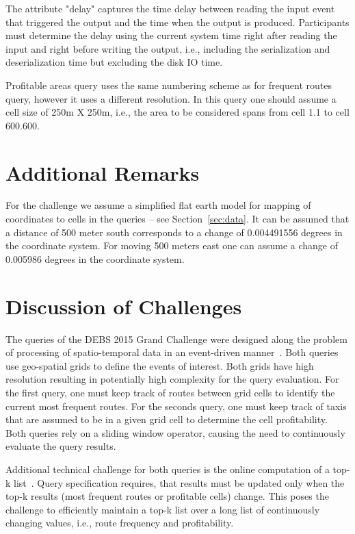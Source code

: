 \documentclass{sig-alternate}
\begin{document}
The attribute "delay" captures the time delay between reading the input event that triggered the output and the time when the output is produced. Participants must determine the delay using the current system time right after reading the input and right before writing the output, i.e., including the serialization and deserialization time but excluding the disk IO time. 

Profitable areas query uses the same numbering scheme as for frequent routes query, however it uses a different resolution. In this query one should assume a cell size of 250m X 250m, i.e., the area to be considered spans from cell 1.1 to cell 600.600.

\section{Additional Remarks}
For the challenge we assume a simplified flat earth model for mapping of coordinates to cells in the queries -- see Section~\ref{sec:data}. It can be assumed that a distance of 500 meter south corresponds to a change of 0.004491556 degrees in the coordinate system. For moving 500 meters east one can assume a change of 0.005986 degrees in the coordinate system.

\section{Discussion of Challenges}
The queries of the DEBS 2015 Grand Challenge were designed along the problem of processing of spatio-temporal data in an event-driven manner~\cite{peuquet1995event, mamoulis2004mining, mokbel2004sina}.  Both queries use geo-spatial grids to define the events of interest. Both grids have high resolution resulting in potentially high complexity for the query evaluation. For the first query, one must keep track of routes between grid cells to identify the current most frequent routes. For the seconds query, one must keep track of taxis that are assumed to be in a given grid cell to determine the cell profitability. Both queries rely on a sliding window operator, causing the need to continuously evaluate the query results.

Additional technical challenge for both queries is the online computation of a top-k list~\cite{ilyas2008survey}. Query specification requires, that results must be updated only when the top-k results (most frequent routes or profitable cells) change. This poses the challenge to efficiently maintain a top-k list over a long list of continuously changing values, i.e., route frequency and profitability.




\end{document}
